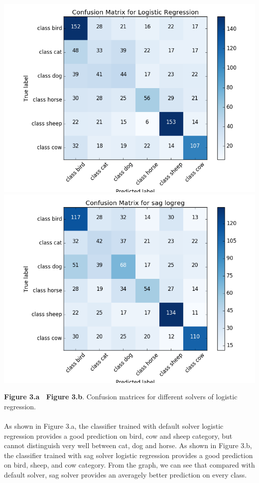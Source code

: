 \documentclass{article}
\begin{document}
\includegraphics[scale=0.38]{logreg_cm_new.png}\includegraphics[scale=0.38]{sag_cm_new.png}
\begin{center}
\textbf{Figure 3.a \ Figure 3.b}. Confusion matrices for different solvers of logistic regression.
\end{center}


\paragraph{}
As shown in Figure 3.a, the classifier trained with default solver logistic regression provides a good prediction on bird, cow and sheep category, but cannot distinguish very well between cat, dog and horse. As shown in Figure 3.b, the classifier trained with sag solver logistic regression provides a good prediction on bird, sheep, and cow category. From the graph, we can see that compared with default solver, sag solver provides an averagely better prediction on every class.
 
\end{document}
